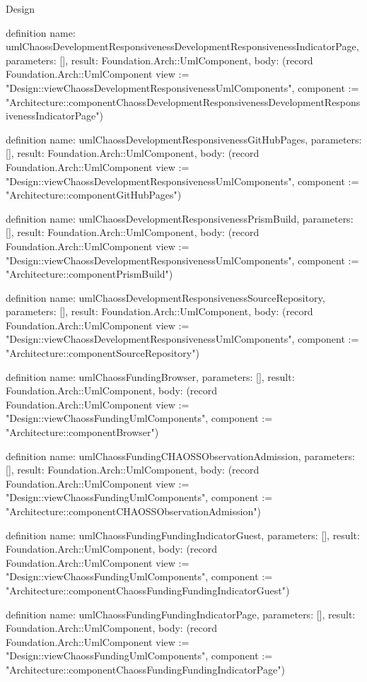 \begin{lexlean}{Design}
\begin{semanticmodule}
definition{
  name: umlChaossDevelopmentResponsivenessDevelopmentResponsivenessIndicatorPage,
  parameters: [],
  result: Foundation.Arch::UmlComponent,
  body: (record Foundation.Arch::UmlComponent {view := "Design::viewChaossDevelopmentResponsivenessUmlComponents", component := "Architecture::componentChaossDevelopmentResponsivenessDevelopmentResponsivenessIndicatorPage"})
}

definition{
  name: umlChaossDevelopmentResponsivenessGitHubPages,
  parameters: [],
  result: Foundation.Arch::UmlComponent,
  body: (record Foundation.Arch::UmlComponent {view := "Design::viewChaossDevelopmentResponsivenessUmlComponents", component := "Architecture::componentGitHubPages"})
}

definition{
  name: umlChaossDevelopmentResponsivenessPrismBuild,
  parameters: [],
  result: Foundation.Arch::UmlComponent,
  body: (record Foundation.Arch::UmlComponent {view := "Design::viewChaossDevelopmentResponsivenessUmlComponents", component := "Architecture::componentPrismBuild"})
}

definition{
  name: umlChaossDevelopmentResponsivenessSourceRepository,
  parameters: [],
  result: Foundation.Arch::UmlComponent,
  body: (record Foundation.Arch::UmlComponent {view := "Design::viewChaossDevelopmentResponsivenessUmlComponents", component := "Architecture::componentSourceRepository"})
}

definition{
  name: umlChaossFundingBrowser,
  parameters: [],
  result: Foundation.Arch::UmlComponent,
  body: (record Foundation.Arch::UmlComponent {view := "Design::viewChaossFundingUmlComponents", component := "Architecture::componentBrowser"})
}

definition{
  name: umlChaossFundingCHAOSSObservationAdmission,
  parameters: [],
  result: Foundation.Arch::UmlComponent,
  body: (record Foundation.Arch::UmlComponent {view := "Design::viewChaossFundingUmlComponents", component := "Architecture::componentCHAOSSObservationAdmission"})
}

definition{
  name: umlChaossFundingFundingIndicatorGuest,
  parameters: [],
  result: Foundation.Arch::UmlComponent,
  body: (record Foundation.Arch::UmlComponent {view := "Design::viewChaossFundingUmlComponents", component := "Architecture::componentChaossFundingFundingIndicatorGuest"})
}

definition{
  name: umlChaossFundingFundingIndicatorPage,
  parameters: [],
  result: Foundation.Arch::UmlComponent,
  body: (record Foundation.Arch::UmlComponent {view := "Design::viewChaossFundingUmlComponents", component := "Architecture::componentChaossFundingFundingIndicatorPage"})
}


\end{semanticmodule}
\end{lexlean}
